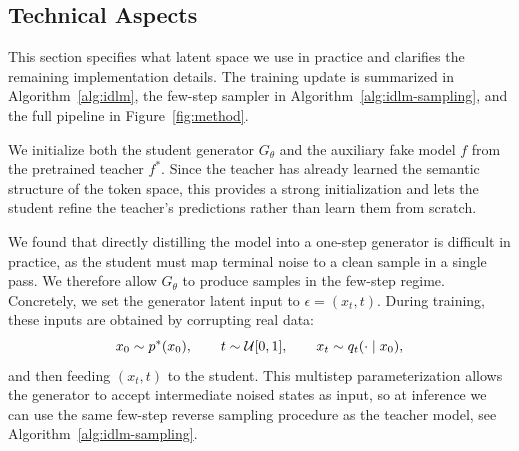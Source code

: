 


\vspace{-1mm}
\subsection{Technical Aspects}
\label{sec:technical aspects}
\vspace{-1mm}
    This section specifies what latent space we use in practice and clarifies the remaining implementation details. The training update is summarized in Algorithm~\ref{alg:idlm}, the few-step sampler in Algorithm~\ref{alg:idlm-sampling}, and the full pipeline in Figure~\ref{fig:method}.
    
    We initialize both the student generator $G_\theta$ and the auxiliary fake model $f$ from the pretrained teacher $f^*$. Since the teacher has already learned the semantic structure of the token space, this provides a strong initialization and lets the student refine the teacher's predictions rather than learn them from scratch.

    We found that directly distilling the model into a one-step generator is difficult in practice, as the student must map terminal noise to a clean sample in a single pass. We therefore allow $G_\theta$ to produce samples in the few-step regime. Concretely, we set the generator latent input to $\epsilon=(x_t,t)$. During training, these inputs are obtained by corrupting real data:
    \[
        x_0\sim p^*(x_0),\qquad
        t\sim \mathcal{U}[0,1],\qquad
        x_t\sim q_t(\cdot\mid x_0),
    \]
    and then feeding $(x_t,t)$ to the student. This multistep parameterization allows the generator to accept intermediate noised states as input, so at inference we can use the same few-step reverse sampling procedure as the teacher model, see Algorithm~\ref{alg:idlm-sampling}.


